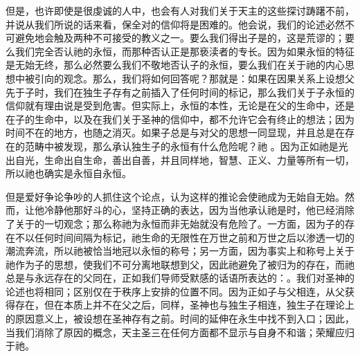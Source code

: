 但是，也许即使是很虔诚的人中，也会有人对我们关于天主的这些探讨踌躇不前，并说从我们所说的话来看，保全对的信仰将是困难的。他会说，我们的论述必然不可避免地会触及两种不可接受的教义之一。要么我们得出子是的，这是荒谬的；要么我们完全否认祂的永恒，而那种否认正是那亵渎者的专长。因为如果永恒的特征是无始无终，那么必然要么我们不敬地否认子的永恒，要么我们在关于祂的内心思想中被引向的观念。那么，我们将如何回答呢？那就是：如果在因果关系上设想父先于子时，我们在独生子存有之前插入了任何时间的标记，那么我们关于子永恒的信仰就有理由说是受到危害。但实际上，永恒的本性，无论是在父的生命中，还是在子的生命中，以及在我们关于圣神的信仰中，都不允许它会有终止的想法；因为时间不在的地方，也随之消灭。如果子总是与对父的思想一同显现，并且总是在存在的范畴中被发现，那么承认独生子的永恒有什么危险呢？祂 。因为正如祂是光出自光，生命出自生命，善出自善，并且同样地，智慧、正义、力量等所有一切，所以祂也确实是永恒自永恒。\par

但是爱好争论争吵的人抓住这个论点，认为这样的推论会使祂成为无始自无始。然而，让他冷静他那好斗的心，坚持正确的表达，因为当他承认祂是时，他已经消除了关于的一切观念；那么称祂为永恒而非无始就没有危险了。一方面，因为子的存在不以任何时间间隔为标记，祂生命的无限性在万世之前和万世之后以渗透一切的潮流奔流，所以祂被恰当地冠以永恒的称号；另一方面，因为事实上和称号上关于祂作为子的思想，使我们不可分离地联想到父，因此祂避免了被归为的存在，而祂总是与永远存在的父同在，正如我们导师受默感的话语所表达的：。我们对圣神的论述也将相同；区别仅在于秩序上安排的位置不同。因为正如子与父相连，从父获得存在，但在本质上并不在父之后，同样，圣神也与独生子相连，独生子在理论上的原因意义上，被设想在圣神存有之前。时间的延伸在永生中找不到入口；因此，当我们消除了原因的概念，天主圣三在任何方面都不显示与自身不和谐；荣耀应归于祂。\par



